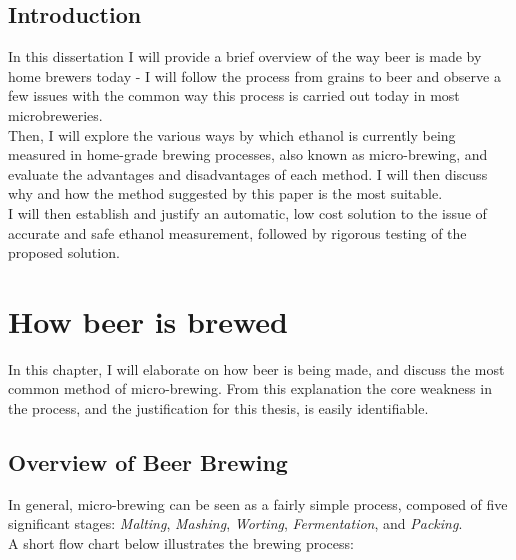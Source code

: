 \documentclass[twoside]{ctuthesis}
\theoremstyle{plain}
\theoremstyle{definition}
\theoremstyle{note}
\begin{document}
\maketitle

\section{Introduction}

In this dissertation I will provide a brief overview of the way beer is made by home brewers today - I will follow the process from grains to beer and observe a few issues with the common way this process is carried out today in most microbreweries.\\
Then, I will explore the various ways by which ethanol is currently being measured in home-grade brewing processes, also known as micro-brewing, and evaluate the advantages and disadvantages of each method. I will then discuss why and how the method suggested by this paper is the most suitable.\\
I will then establish and justify an automatic, low cost solution to the issue of accurate and safe ethanol measurement, followed by rigorous testing of the proposed solution.

\pagebreak

\begingroup
\renewcommand{\cleardoublepage}{}
\renewcommand{\clearpage}{}
\chapter{How beer is brewed}
\endgroup

In this chapter, I will elaborate on how beer is being made, and discuss the most common method of micro-brewing. From this explanation the core weakness in the process, and the justification for this thesis, is easily identifiable.

\section{Overview of Beer Brewing}
In general, micro-brewing can be seen as a fairly simple process, composed of five significant stages: \textit{Malting}, \textit{Mashing}, \textit{Worting}, \textit{Fermentation}, and \textit{Packing}.\\
A short flow chart below illustrates the brewing process:
\end{document}
